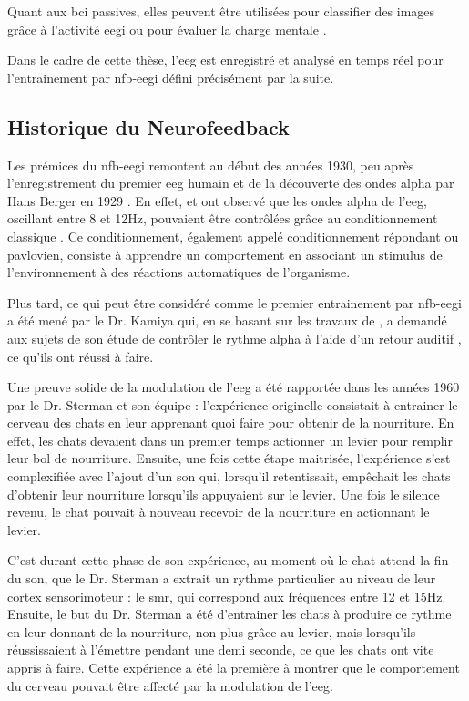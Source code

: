 Quant aux \gls{bci} passives, elles peuvent être utilisées pour classifier des images grâce à l'activité \gls{eegi} ou pour évaluer la charge mentale \citep{George2014}.   

Dans le cadre de cette thèse, l'\gls{eeg} est enregistré et analysé en temps réel pour l'entrainement par \gls{nfb}-\gls{eegi} défini précisément par la suite.  
 

\subsection{Historique du Neurofeedback}

Les prémices du \gls{nfb}-\gls{eegi} remontent au début des années 1930, peu après l'enregistrement du premier \gls{eeg} humain et de la découverte des ondes alpha par Hans Berger en 1929 \citep{Berger1929}.
En effet, \citet{Durup1935} et \citet{Loomis1936} ont observé que les ondes alpha de l'\gls{eeg}, oscillant entre 8 et 12Hz, pouvaient être contrôlées grâce au 
conditionnement classique \citep{Pavlov1929}. Ce conditionnement, également appelé conditionnement répondant ou pavlovien, consiste à apprendre un comportement en associant un stimulus
de l'environnement à des réactions automatiques de l'organisme.

Plus tard, ce qui peut être considéré comme le premier entrainement par \gls{nfb}-\gls{eegi} a été mené par le Dr. Kamiya qui, en se basant sur les travaux de \citet{Durup1935}, 
a demandé aux sujets de son étude de contrôler le rythme alpha à l'aide d'un retour auditif \citep{Kamiya1969}, ce qu'ils ont réussi à faire. 

Une preuve solide de la modulation de l'\gls{eeg} a été rapportée dans les années 1960 par le Dr. Sterman et son équipe \citep{Sterman1969} : l'expérience 
originelle consistait à entrainer le cerveau des chats en leur apprenant quoi faire pour obtenir de 
la nourriture. En effet, les chats devaient dans un premier temps actionner un levier pour remplir leur bol de nourriture. Ensuite, une fois cette étape maitrisée, 
l'expérience s'est complexifiée avec l'ajout d'un son qui, lorsqu'il retentissait, empêchait les chats d'obtenir leur nourriture lorsqu'ils appuyaient sur le levier.
Une fois le silence revenu, le chat pouvait à nouveau recevoir de la nourriture en actionnant le levier.  

C'est durant cette phase de son expérience, au moment où le chat attend la fin du son, que le Dr. Sterman a extrait un rythme particulier au niveau de leur cortex sensorimoteur : 
le \gls{smr}, qui correspond aux fréquences entre 12 et 15Hz. Ensuite, le but du Dr. Sterman a été d'entrainer les chats à produire ce rythme en leur donnant de la nourriture, non plus grâce 
au levier, mais lorsqu'ils réussissaient à l'émettre pendant une demi seconde, ce que les chats ont vite appris à faire. Cette expérience a été la première à montrer que le comportement
du cerveau pouvait être affecté par la modulation de l'\gls{eeg}. 

